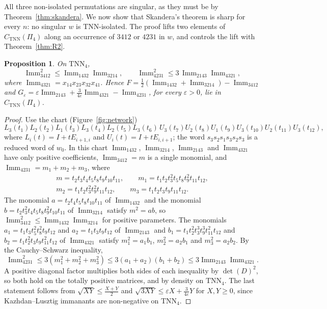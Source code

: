 \documentclass[11pt]{amsart}
\newtheorem{proposition}[theorem]{Proposition}
\theoremstyle{definition}
\theoremstyle{remark}
\newcommand{\Imm}{\operatorname{Imm}}
\newcommand{\TNN}{\mathrm{TNN}}
\newcommand{\CTNN}{C_{\mathrm{TNN}}}
\begin{document}
All three non-isolated permutations are singular, as they must be by Theorem~\ref{thm:skandera}. We now show that Skandera's theorem is sharp for every $n$: no singular $w$ is TNN-isolated. The proof lifts two elements of $\CTNN(\Pi_4)$ along an occurrence of $3412$ or $4231$ in $w$, and controls the lift with Theorem~\ref{thm:R2}.

\begin{proposition}\label{prop:n4ineq}
On $\TNN_4$,
\[
\Imm_{3412}^2\le\Imm_{1432}\Imm_{3214},\qquad \Imm_{4231}^2\le3\,\Imm_{2143}\Imm_{4321},
\]
where $\Imm_{4321}=x_{14}x_{23}x_{32}x_{41}$. Hence $F=\tfrac12(\Imm_{1432}+\Imm_{3214})-\Imm_{3412}$ and $G_\varepsilon=\varepsilon\Imm_{2143}+\tfrac{3}{4\varepsilon}\Imm_{4321}-\Imm_{4231}$, for every $\varepsilon>0$, lie in $\CTNN(\Pi_4)$.
\end{proposition}

\begin{proof}
Use the chart (Figure~\ref{fig:network})
\[
L_3(t_1)L_2(t_2)L_1(t_3)L_3(t_4)L_2(t_5)L_3(t_6)\,U_3(t_7)U_2(t_8)U_1(t_9)U_3(t_{10})U_2(t_{11})U_3(t_{12}),
\]
where $L_i(t)=I+tE_{i+1,i}$ and $U_i(t)=I+tE_{i,i+1}$; the word $s_3s_2s_1s_3s_2s_3$ is a reduced word of $w_0$. In this chart $\Imm_{1432}$, $\Imm_{3214}$, $\Imm_{2143}$ and $\Imm_{4321}$ have only positive coefficients, $\Imm_{3412}=m$ is a single monomial, and $\Imm_{4231}=m_1+m_2+m_3$, where
\begin{gather*}
m=t_2t_3t_4t_5t_8t_9t_{10}t_{11},\qquad m_1=t_1t_2t_3^2t_5t_8t_9^2t_{11}t_{12},\\
m_2=t_1t_2t_3^2t_9^2t_{11}t_{12},\qquad m_3=t_1t_2t_3t_9t_{11}t_{12}.
\end{gather*}
The monomial $a=t_2t_4t_5t_8t_{10}t_{11}$ of $\Imm_{1432}$ and the monomial $b=t_2t_3^2t_4t_5t_8t_9^2t_{10}t_{11}$ of $\Imm_{3214}$ satisfy $m^2=ab$, so $\Imm_{3412}^2\le\Imm_{1432}\Imm_{3214}$ for positive parameters. The monomials $a_1=t_1t_3t_5^2t_8^2t_9t_{12}$ and $a_2=t_1t_3t_9t_{12}$ of $\Imm_{2143}$ and $b_1=t_1t_2^2t_3^3t_9^3t_{11}^2t_{12}$ and $b_2=t_1t_2^2t_3t_9t_{11}^2t_{12}$ of $\Imm_{4321}$ satisfy $m_1^2=a_1b_1$, $m_2^2=a_2b_1$ and $m_3^2=a_2b_2$. By the Cauchy--Schwarz inequality,
\[
\Imm_{4231}^2\le3(m_1^2+m_2^2+m_3^2)\le3(a_1+a_2)(b_1+b_2)\le3\Imm_{2143}\Imm_{4321} .
\]
A positive diagonal factor multiplies both sides of each inequality by $\det(D)^2$, so both hold on the totally positive matrices, and by density on $\TNN_4$. The last statement follows from $\sqrt{XY}\le\frac{X+Y}2$ and $\sqrt{3XY}\le\varepsilon X+\frac3{4\varepsilon}Y$ for $X,Y\ge0$, since Kazhdan--Lusztig immanants are non-negative on $\TNN_4$.
\end{proof}
\end{document}
